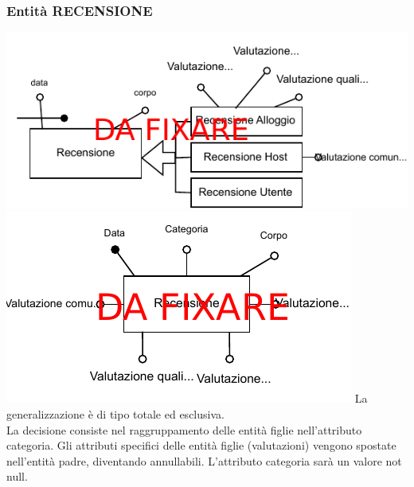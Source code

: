 \subsubsection{Entità RECENSIONE}
\includegraphics[width=\textwidth]{resources/page7}
\includegraphics[width=\textwidth]{resources/page8}
La generalizzazione è di tipo totale ed esclusiva.\\
La decisione consiste nel raggruppamento delle entità	figlie nell'attributo categoria. Gli attributi specifici delle entità figlie (valutazioni) vengono spostate nell'entità padre, diventando annullabili. L'attributo categoria sarà un valore not null.

